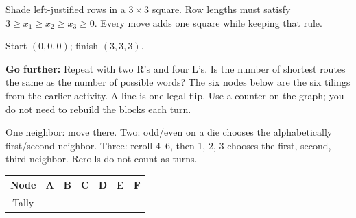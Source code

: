 \documentclass[11pt]{article}
\begin{document}
\begin{center}\begin{minipage}{.23\linewidth}\centering\RowPicture\end{minipage}\hfill\begin{minipage}{.71\linewidth}Shade left-justified rows in a \(3\times3\) square. Row lengths must satisfy \(3\geq x_1\geq x_2\geq x_3\geq0\). Every move adds one square while keeping that rule.\par Start \((0,0,0)\); finish \((3,3,3)\).\end{minipage}\end{center}
\begin{center}\ExtensionRouteTableBlank\end{center}
\textbf{Go further:} Repeat with two R's and four L's. Is the number of shortest routes the same as the number of possible words?
\StudentFooter
\newpage
{}
The six nodes below are the six tilings from the earlier activity. A line is one legal flip. Use a counter on the graph; you do not need to rebuild the blocks each turn.
\begin{center}\WalkGraph\end{center}
{\small One neighbor: move there. Two: odd/even on a die chooses the alphabetically first/second neighbor. Three: reroll 4--6, then 1, 2, 3 chooses the first, second, third neighbor. Rerolls do not count as turns.}
\begin{center}\renewcommand{\arraystretch}{1.65}\begin{tabular}{c|p{.65in}|p{.65in}|p{.65in}|p{.65in}|p{.65in}|p{.65in}}Node&A&B&C&D&E&F\\\hline Tally&&&&&&\end{tabular}\end{center}
\end{document}
